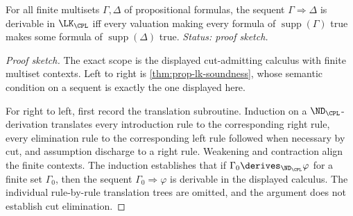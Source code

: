 \begin{theorem}
\label{thm:prop-lk-completeness}
For all finite multisets \(\Gamma,\Delta\) of propositional formulas, the
sequent \(\Gamma\Rightarrow\Delta\) is derivable in \(\LK_{\CPL}\) iff
every valuation making every formula of \(\operatorname{supp}(\Gamma)\)
true makes some formula of \(\operatorname{supp}(\Delta)\) true.
\textit{Status: proof sketch.}
\end{theorem}
\begin{proof}[Proof sketch]
The exact scope is the displayed cut-admitting calculus with finite multiset
contexts.  Left to right is \cref{thm:prop-lk-soundness}, whose semantic
condition on a sequent is exactly the one displayed here.

For right to left, first record the translation subroutine.  Induction on
a \(\ND_{\CPL}\)-derivation translates every introduction rule to the
corresponding right rule, every elimination rule to the corresponding
left rule followed when necessary by cut, and assumption discharge to a
right rule.  Weakening and contraction align the finite contexts.  The
induction establishes that if
\(\Gamma_0\derives_{\ND_{\CPL}}\varphi\) for a finite set \(\Gamma_0\),
then the sequent \(\Gamma_0\Rightarrow\varphi\) is derivable in the
displayed calculus.  The individual rule-by-rule translation trees are
omitted, and the argument does not establish cut elimination.


\end{proof}
